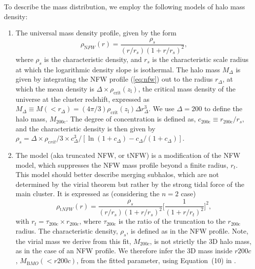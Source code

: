 \documentclass[iop,twocolumn]{emulateapj}
\def\lcdm{\mbox{$\Lambda$CDM}}
\begin{document}
To describe the mass distribution, we employ the following models of halo mass density:
\begin{enumerate}
 \item
The universal  \citet[][NFW]{NFW96}  mass density profile, given by the form 
\begin{equation}\label{eq:nfw}
\rho_{\mathrm NFW}(r)=\frac{\rho_{s}}{(r/r_s)(1+r/r_s)^{2}},
\end{equation} 
where $\rho_{s}$ is the characteristic density, and
$r_s$ is the characteristic scale radius at which the logarithmic density slope is isothermal. 
The halo mass $M_{\Delta}$ is  given by integrating the NFW profile (\autoref{eq:nfw})
out to the  radius $r_{\Delta}$, at which the mean density is $\Delta\times\rho_\mathrm{crit}(z_\mathrm{l})$, the critical mass density of the universe at the cluster redshift, expressed as
$ M_{\Delta} \equiv  M(<r_{\Delta})= (4\pi/3)\rho_\mathrm{crit}(z_\mathrm{l})
      \Delta r_{\Delta}^3 $. We use $\Delta=200$ to define the halo
      mass, $ M_\mathrm{200c}$. The degree of concentration is defined as,
      $c_\mathrm{200c}\equiv r_\mathrm{200c}/r_s$, and the characteristic density is
      then given by $\rho_s ={\Delta\times \rho_{\mathrm crit}}/{3}\times{c_\Delta^3}/[{\ln(1+c_\Delta)-c_\Delta/(1+c_\Delta)}]$.

\item
The \cite{Baltz2009} model (aka truncated NFW, or tNFW) is a modification of the NFW model, which suppresses the NFW mass profile beyond a finite radius, $r_t$. This model should better describe merging subhalos, which are not determined by the virial theorem but rather by the strong tidal force of the main cluster. It is expressed as (considering the $n=2$ case)
\begin{equation}
 \rho_{\mathrm tNFW}(r)=\frac{\rho_{s}}{(r/r_s)(1+r/r_s)^{2}}\bigg[\frac{1}{(1+r/r_t)^{2}}\bigg]^2,
\end{equation}
with $r_t=\tau_\mathrm{200c}\times r_\mathrm{200c}$, where $\tau_\mathrm{200c}$ is the ratio of the truncation to the $r_\mathrm{200c}$ radius. The characteristic density, $\rho_s$, is defined as in the NFW profile. Note, the virial mass we derive from this fit, $M_{200c}$, is not strictly the 3D halo mass, as in the case of an NFW profile. We therefore infer the 3D mass inside $r200c$, $M_{\mathrm BMO}(<r200c)$, from the fitted parameter, using Equation~(10) in \cite{Oguri2011}.

\end{enumerate}
\end{document}
